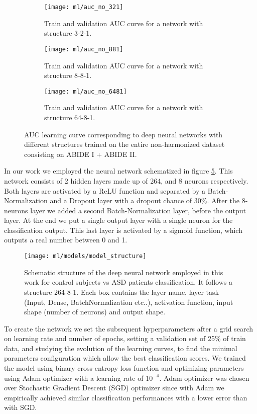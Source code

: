 \documentclass[11pt]{report}
\begin{document}
\begin{figure}
\centering
\begin{subfigure}[b]{0.3\textwidth}
   \texttt{[image: ml/auc\_no\_321]}
   \caption{Train and validation AUC curve for a network with structure 3-2-1.}
   \label{fig:auc_no3-2-1}
\end{subfigure}
\begin{subfigure}[b]{0.3\textwidth}
   \texttt{[image: ml/auc\_no\_881]}
   \caption{Train and validation AUC curve for a network with structure 8-8-1.}
   \label{fig:auc_no8-8-1}
\end{subfigure}
\begin{subfigure}[b]{0.3\textwidth}
   \texttt{[image: ml/auc\_no\_6481]}
   \caption{Train and validation AUC curve for a network with structure 64-8-1.}
   \label{fig:auc_no64-8-1}
\end{subfigure}
\caption{AUC learning curve corresponding to deep neural networks with different structures trained on the entire non-harmonized dataset consisting on ABIDE I + ABIDE II.}
\label{fig:learningcurve}
\end{figure}


In our work we employed the neural network schematized in figure \ref{fig:model_structure}.
This network consists of 2 hidden layers made up of 264, and 8 neurons respectively. 
Both layers are activated by a ReLU function and separated by a Batch-Normalization and a Dropout layer with a dropout chance of 30\%.
After the 8-neurons layer we added a second Batch-Normalization layer, before the output layer.
At the end we put a single output layer with a single neuron for the classification output.
This last layer is activated by a sigmoid function, which outputs a real number between 0 and 1.



\begin{figure}[h!]
\centering
\texttt{[image: ml/models/model\_structure]}
\caption{Schematic structure of the deep neural network employed in this work for control subjects vs ASD patients classification. It follows a structure 264-8-1.
Each box contains the layer name, layer task (Input, Dense, BatchNormalization etc..), activation function, input shape (number of neurons) and output shape.}
\label{fig:model_structure}
\end{figure}


To create the network we set the subsequent hyperparameters after a grid search on learning rate and number of epochs, setting a validation set of 25\% of train data, and studying the evolution of the learning curves, to find the minimal parameters configuration which allow the best classification scores.
We trained the model using binary cross-entropy loss function and optimizing parameters using Adam optimizer with a learning rate of $10^{-4}$.
Adam optimizer was chosen over Stochastic Gradient Descent (SGD) optimizer since with Adam we empirically achieved similar classification performances with a lower error than with SGD.
\end{document}
